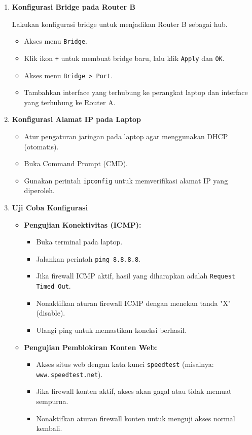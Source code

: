 \begin{enumerate}
    \item \textbf{Konfigurasi Bridge pada Router B}

    Lakukan konfigurasi bridge untuk menjadikan Router B sebagai hub.

    \begin{itemize}
        \item Akses menu \texttt{Bridge}.
        \item Klik ikon \texttt{+} untuk membuat bridge baru, lalu klik \texttt{Apply} dan \texttt{OK}.
        \item Akses menu \texttt{Bridge > Port}.
        \item Tambahkan interface yang terhubung ke perangkat laptop dan interface yang terhubung ke Router A.
    \end{itemize}

    \item \textbf{Konfigurasi Alamat IP pada Laptop}

    \begin{itemize}
        \item Atur pengaturan jaringan pada laptop agar menggunakan DHCP (otomatis).
        \item Buka Command Prompt (CMD).
        \item Gunakan perintah \texttt{ipconfig} untuk memverifikasi alamat IP yang diperoleh.
    \end{itemize}

    \item \textbf{Uji Coba Konfigurasi}

    \begin{itemize}
        \item \textbf{Pengujian Konektivitas (ICMP):}
        \begin{itemize}
            \item Buka terminal pada laptop.
            \item Jalankan perintah \texttt{ping 8.8.8.8}.
            \item Jika firewall ICMP aktif, hasil yang diharapkan adalah \texttt{Request Timed Out}.
            \item Nonaktifkan aturan firewall ICMP dengan menekan tanda "X" (disable).
            \item Ulangi ping untuk memastikan koneksi berhasil.
        \end{itemize}
        \item \textbf{Pengujian Pemblokiran Konten Web:}
        \begin{itemize}
            \item Akses situs web dengan kata kunci \texttt{speedtest} (misalnya: \texttt{www.speedtest.net}).
            \item Jika firewall konten aktif, akses akan gagal atau tidak memuat sempurna.
            \item Nonaktifkan aturan firewall konten untuk menguji akses normal kembali.
        \end{itemize}
    \end{itemize}
\end{enumerate}

